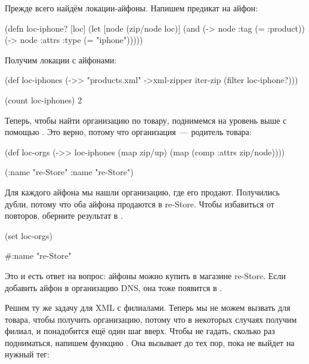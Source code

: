 Прежде всего найдём локации-айфоны. Напишем предикат на айфон:

\begin{english}
  \begin{clojure}
(defn loc-iphone? [loc]
  (let [node (zip/node loc)]
    (and (-> node :tag (= :product))
         (-> node :attrs :type (= "iphone")))))
  \end{clojure}
\end{english}

Получим локации с айфонами:

\begin{english}
  \begin{clojure}
(def loc-iphones
  (->> "products.xml"
       ->xml-zipper
       iter-zip
       (filter loc-iphone?)))

(count loc-iphones)
2
  \end{clojure}
\end{english}

Теперь, чтобы найти организацию по товару, поднимемся на уровень выше с помощью
. Это верно, потому что организация~--- родитель товара:

\begin{english}
  \begin{clojure}
(def loc-orgs
  (->> loc-iphones
       (map zip/up)
       (map (comp :attrs zip/node))))

({:name "re-Store"}
 {:name "re-Store"})
  \end{clojure}
\end{english}

Для каждого айфона мы нашли организацию, где его продают. Получились дубли,
потому что оба айфона продаются в re-Store. Чтобы избавиться от повторов,
оберните результат в .

\begin{english}
  \begin{clojure}
(set loc-orgs)

#{{:name "re-Store"}}
  \end{clojure}
\end{english}

Это и есть ответ на вопрос: айфоны можно купить в магазине re-Store. Если
добавить айфон в организацию DNS, она тоже появится в .

Решим ту же задачу для XML с филиалами. Теперь мы не можем вызвать 
для товара, чтобы получить организацию, потому что в некоторых случаях получим
филиал, и понадобится ещё один шаг вверх. Чтобы не гадать, сколько раз
подниматься, напишем функцию . Она вызывает  до тех
пор, пока не выйдет на нужный тег:

